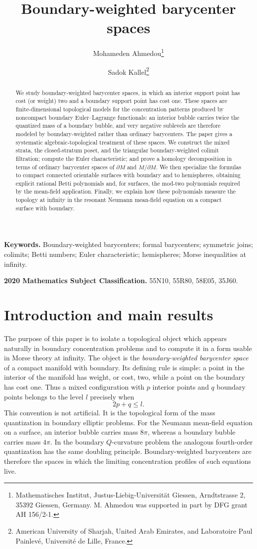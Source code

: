 \documentclass[11pt,a4paper]{article}
\title{\bfseries Boundary-weighted barycenter spaces}
\author{
Mohameden Ahmedou\thanks{Mathematisches Institut, Justus-Liebig-Universit\"at Giessen,
Arndtstrasse 2, 35392 Giessen, Germany. M. Ahmedou was supported in part by
DFG grant AH 156/2-1.}
\and
Sadok Kallel\thanks{American University of Sharjah, United Arab Emirates, and
Laboratoire Paul Painlev\'e, Universit\'e de Lille, France.}
}
\numberwithin{equation}{section}
\theoremstyle{definition}
\theoremstyle{remark}
\begin{document}
\maketitle

\begin{abstract}
We study boundary-weighted barycenter spaces, in which an interior support point has cost (or weight) two and a boundary support point has cost one.  These spaces are finite-dimensional topological models for the concentration patterns produced by noncompact boundary Euler--Lagrange functionals: an interior bubble carries twice the quantized mass of a boundary bubble, and very negative sublevels are therefore modeled by boundary-weighted rather than ordinary barycenters.  The paper gives a systematic algebraic-topological treatment of these spaces.  We construct the mixed strata, the closed-stratum poset, and the triangular boundary-weighted colimit filtration; compute the Euler characteristic; and prove a homology decomposition in terms of ordinary barycenter spaces of \(\partial M\) and \(M/\partial M\).  We then specialize the formulas to compact connected orientable surfaces with boundary and to hemispheres, obtaining explicit rational Betti polynomials and, for surfaces, the mod-two polynomials required by the mean-field application.  Finally, we explain how these polynomials measure the topology at infinity in the resonant Neumann mean-field equation on a compact surface with boundary.
\end{abstract}

\noindent\textbf{Keywords.} Boundary-weighted barycenters; formal barycenters; symmetric joins; colimits; Betti numbers; Euler characteristic; hemispheres; Morse inequalities at infinity.

\smallskip
\noindent\textbf{2020 Mathematics Subject Classification.} 55N10, 55R80, 58E05, 35J60.

\tableofcontents

\section{Introduction and main results}
\label{sec:intro}

The purpose of this paper is to isolate a topological object which appears naturally in boundary concentration problems and to compute it in a form usable in Morse theory at infinity.  The object is the \emph{boundary-weighted barycenter space} of a compact manifold with boundary.  Its defining rule is simple: a point in the interior of the manifold has weight, or cost, two, while a point on the boundary has cost one.  Thus a mixed configuration with \(p\) interior points and \(q\) boundary points belongs to the level \(l\) precisely when
\[
2p+q\le l.
\]
This convention is not artificial.  It is the topological form of the mass quantization in boundary elliptic problems.  For the Neumann mean-field equation on a surface, an interior bubble carries mass \(8\pi\), whereas a boundary bubble carries mass \(4\pi\).  In the boundary \(Q\)-curvature problem the analogous fourth-order quantization has the same doubling principle.  Boundary-weighted barycenters are therefore the spaces in which the limiting concentration profiles of such equations live.
\end{document}
